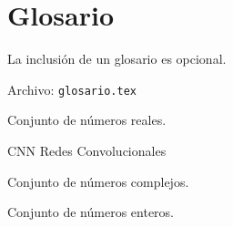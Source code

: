 
\chapter*{Glosario}

La inclusión de un glosario es opcional.

Archivo: \texttt{glosario.tex}

\begin{description} 
  \item[$\mathbb{R}$] Conjunto de números reales.
  \item CNN Redes Convolucionales

  \item[$\mathbb{C}$] Conjunto de números complejos.

  \item[$\mathbb{Z}$] Conjunto de números enteros.
\end{description}
\endinput
